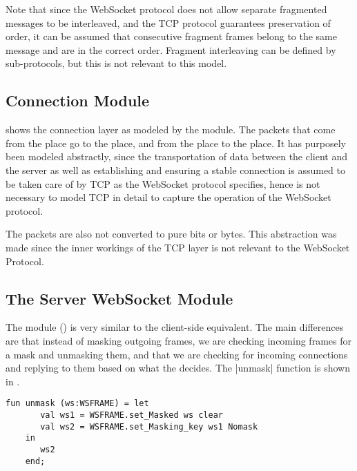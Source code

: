 			Note that since the WebSocket protocol does not allow separate fragmented
			messages to be interleaved, and the TCP protocol guarantees preservation of
			order, it can be assumed that consecutive fragment frames belong to the same
			message and are in the correct order.
			Fragment interleaving can be defined by sub-protocols, but this is not
			relevant to this model.
			
\subsection{Connection Module}

	
	 shows the connection layer as modeled by the
	 module. The packets that come from the  place go to the  place, and from the
	 place to the  place. It has
	purposely been modeled abstractly, since the transportation of data between the
	client and the server as well as establishing and ensuring a stable
	connection is assumed to be taken care of by TCP as the WebSocket protocol
	specifies, hence is not necessary to model TCP in detail to capture the
	operation of the WebSocket protocol.
	
	The packets are also not converted to pure bits or bytes. This abstraction was
	made since the inner workings of the TCP layer is not relevant to the WebSocket
	Protocol.

\subsection{The Server WebSocket Module}
	
	
	The  module () is very similar
	to the client-side equivalent.
	The main differences are that instead of masking outgoing frames, we are checking
	incoming frames for a mask and unmasking them, and that we are checking for
	incoming connections and replying to them based on what the  decides. The |unmask| function is shown in .
	 
	\begin{lstlisting}[label=lst:unmask,caption=unmask,gobble=1,float=h]
	fun unmask (ws:WSFRAME) = let
	   val ws1 = WSFRAME.set_Masked ws clear
	   val ws2 = WSFRAME.set_Masking_key ws1 Nomask
	in 
	   ws2
	end;
	\end{lstlisting}
		
